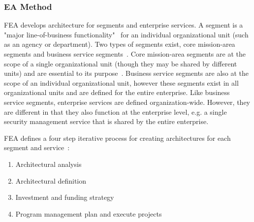 \subsubsection{EA Method}


FEA develops architecture for segments and enterprise services. A segment is a "major line-of-business functionality"~\cite{sessions2007} for an individual organizational unit (such as an agency or department). Two types of segments exist, core mission-area segments and business service segments~\cite{FederalEnterpriseArchitectureProgramManagementOffice2007}. Core mission-area segments are at the scope of a single organizational unit (though they may be shared by different units) and are essential to its purpose~\cite{sessions2007,FederalEnterpriseArchitectureProgramManagementOffice2007}. Business service segments are also at the scope of an individual organizational unit, however these segments exist in all organizational units and are defined for the entire enterprise. Like business service segments, enterprise services are defined organization-wide. However, they are different in that they also function at the enterprise level, e.g. a single security management service that is shared by the entire enterprise. 

%
%

 
FEA defines a four step iterative process for creating architectures for each segment and service~\cite{FederalEnterpriseArchitectureProgramManagementOffice2007}:
\begin{enumerate}
    \item Architectural analysis
    \item Architectural definition
    \item Investment and funding strategy
    \item Program management plan and execute projects
\end{enumerate}

